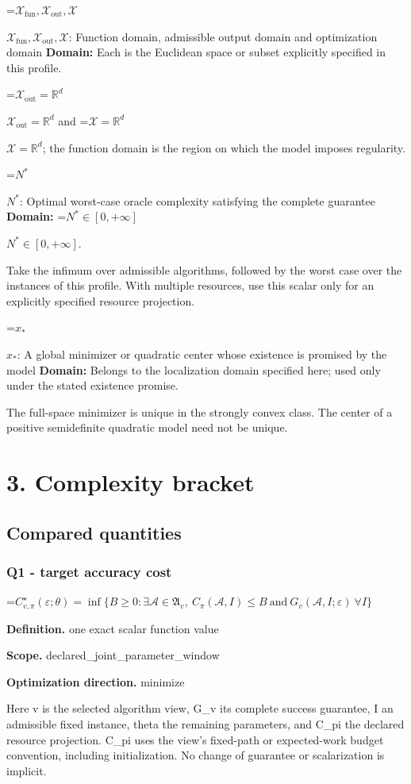 \documentclass[10pt,a4paper]{article}
\newcommand{\AtlasMath}[1]{\par\begingroup\centering\setbox0=\hbox{$\displaystyle #1$}\ifdim\wd0>1.4\linewidth\typeout{ATLAS WIDE FORMULA: \the\wd0}\fi\ifdim\wd0>\linewidth\resizebox{\linewidth}{!}{\box0}\else\box0\fi\par\endgroup}
\newcommand{\AtlasInlineMath}[1]{\begingroup\setbox0=\hbox{$#1$}\ifdim\wd0>.4\linewidth\endgroup\AtlasMath{#1}\else\endgroup$#1$\fi}
\begin{document}
\AtlasInlineMath{\mathcal{X}_{\mathrm{fun}},\mathcal{X}_{\mathrm{out}},\mathcal{X}}: Function domain, admissible output domain and optimization domain \textbf{Domain:} Each is the Euclidean space or subset explicitly specified in this profile.

\AtlasInlineMath{\mathcal{X}_{\mathrm{out}}=\mathbb{R}^d} and \AtlasInlineMath{\mathcal{X}=\mathbb{R}^d}; the function domain is the region on which the model imposes regularity.

\AtlasInlineMath{N^*}: Optimal worst-case oracle complexity satisfying the complete guarantee \textbf{Domain:} \AtlasInlineMath{N^*\in[0,+\infty]}.

Take the infimum over admissible algorithms, followed by the worst case over the instances of this profile. With multiple resources, use this scalar only for an explicitly specified resource projection.

\AtlasInlineMath{x_*}: A global minimizer or quadratic center whose existence is promised by the model \textbf{Domain:} Belongs to the localization domain specified here; used only under the stated existence promise.

The full-space minimizer is unique in the strongly convex class. The center of a positive semidefinite quadratic model need not be unique.

\section{3. Complexity bracket}
\subsection{Compared quantities}
\subsubsection{Q1 - target accuracy cost}
\AtlasMath{C^\star_{v,\pi}(\varepsilon;\theta)=\inf\{B\ge0:\exists\mathcal A\in\mathfrak A_v,\ C_\pi(\mathcal A,I)\le B\ \text{and}\ G_v(\mathcal A,I;\varepsilon)\ \forall I\}}
\textbf{Definition.} one exact scalar function value

\textbf{Scope.} declared\_joint\_parameter\_window

\textbf{Optimization direction.} minimize

Here v is the selected algorithm view, G\_v its complete success guarantee, I an admissible fixed instance, theta the remaining parameters, and C\_pi the declared resource projection. C\_pi uses the view's fixed-path or expected-work budget convention, including initialization. No change of guarantee or scalarization is implicit.
\end{document}
